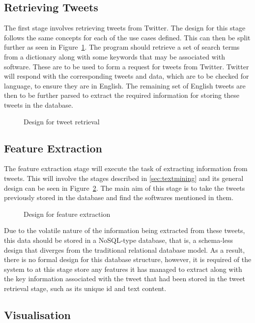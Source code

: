 \subsection{Retrieving Tweets}
\label{sec:arc1}
The first stage involves retrieving tweets from Twitter. The design for this stage follows the same concepts for each of the use cases defined. This can then be split further as seen in Figure~\ref{fig:phase1}. The program should retrieve a set of search terms from a dictionary along with some keywords that may be associated with software. These are to be used to form a request for tweets from Twitter. Twitter will respond with the corresponding tweets and data, which are to be checked for language, to ensure they are in English. The remaining set of English tweets are then to be further parsed to extract the required information for storing these tweets in the database.

\begin{figure}[h]
  \centering
  
  \caption{Design for tweet retrieval
    \label{fig:phase1}}
\end{figure}



\subsection{Feature Extraction}
\label{sec:arc2}
The feature extraction stage will execute the task of extracting information from tweets. This will involve the stages described in \ref{sec:textmining} and its general design can be seen in Figure~\ref{fig:phase2}. The main aim of this stage is to take the tweets previously stored in the database and find the softwares mentioned in them.

\begin{figure}[h]
  \centering
  
  \caption{Design for feature extraction
    \label{fig:phase2}}
\end{figure}

Due to the volatile nature of the information being extracted from these tweets, this data should be stored in a NoSQL-type database, that is, a schema-less design that diverges from the traditional relational database model. As a result, there is no formal design for this database structure, however, it is required of the system to at this stage store any features it has managed to extract along with the key information associated with the tweet that had been stored in the tweet retrieval stage, such as its unique id and text content.

\subsection{Visualisation}
\label{sec:arc3}
